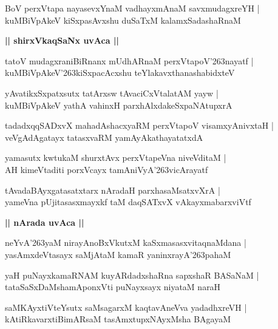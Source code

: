 \documentclass[twoside,12pt,openright]{book}
\def\S{\char'263}
\newcounter{shloka}[chapter]
\def\uvaca#1{\centerline{{\large\textbf{#1}}}}
\begin{document}
\begin{shloka}%
BoV perxVtapa nayasevxYnaM vadhayxmAnaM savxmudagxreYH |\\
kuMBiVpAkeV kiSxpasAvxshu duSaTxM kalamxSadashaRnaM
\end{shloka}

\uvaca{|| shirxVkaqSaNx uvAca ||}

\begin{shloka}%
tatoV mudagxraniBiRnanx mUdhARnaM perxVtapoV\S nayatf |\\
kuMBiVpAkeV\S kiSxpacAcxshu teYlakavxthanashabidxteV 
\end{shloka}

\begin{shloka}%
yAvatikxSxpatxsutx tatArxsw tAvaciCxVtalatAM yayw |\\
kuMBiVpAkeV yathA vahinxH parxhAlxdakeSxpaNAtupxrA 
\end{shloka}

\begin{shloka}%
tadadxqqSADxvX mahadAshacxyaRM perxVtapoV visamxyAnivxtaH |\\
veVgAdAgatayx tatasxvaRM yamAyAkathayatatxdA 
\end{shloka}

\begin{shloka}%
yamasutx kwtukaM shurxtAvx perxVtapeVna niveVditaM |\\
AH kimeVtaditi porxVcayx tamAniVyA\S vicArayatf
\end{shloka}

\begin{shloka}%
tAvadaBAyxgatasatxtarx nAradaH parxhasaMsatxvXrA |\\
yameVna pUjitasasxmayxkf taM daqSATxvX vAkayxmabarxviVtf
\end{shloka}

\uvaca{|| nArada uvAca ||}

\begin{shloka}%
neYvA\S yaM nirayAnoBxVkutxM kaSxmasasxvitaqnaMdana |\\
yasAmxdeVtasayx saMjAtaM kamaR yaninxrayA\S pahaM 
\end{shloka}

\begin{shloka}%
yaH puNayxkamaRNAM kuyARdadxshaRna sapxshaR BASaNaM |\\
tataSaSxDaMshamAponxVti puNayxsayx niyataM naraH 
\end{shloka}

\begin{shloka}%
saMKAyxtiVteYsutx saMsagarxM kaqtavAneVva yadadhxreVH |\\
kAtiRkavarxtiBimARsaM tasAmxtupxNAyxMsha BAgayaM 
\end{shloka}
\end{document}
